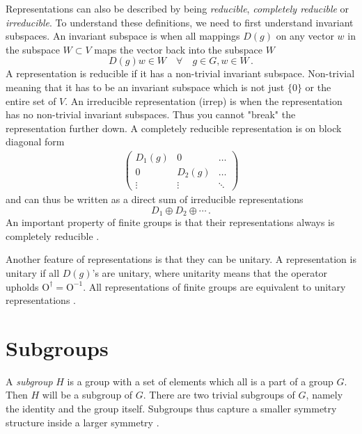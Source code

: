 Representations can also be described by being \textit{reducible},\textit{ completely reducible} or \textit{irreducible}. To understand these definitions, we need to first understand invariant subspaces. An invariant subspace is when all mappings $D(g)$ on any vector $w$ in the subspace $W\subset V $ maps the vector back into the subspace $W$ \cite{Georgi:1999wka}
\begin{equation}
    D(g)w\in W\quad \forall\quad g\in G, w\in W\,.
\end{equation}
A representation is reducible if it has a non-trivial invariant subspace. Non-trivial meaning that it has to be an invariant subspace which is not just $\{0\}$ or the entire set of $V$. An irreducible representation (irrep) is when the representation has no non-trivial invariant subspaces. Thus you cannot "break" the representation further down. A completely reducible representation is on block diagonal form 
\begin{align}
    \begin{pmatrix}
        D_1(g) & 0      & \dots  \\
        0      & D_2(g) & \dots  \\
        \vdots & \vdots & \ddots
    \end{pmatrix}
\end{align}
and can thus be written as a direct sum of irreducible representations
\begin{equation}
    D_1\oplus D_2 \oplus \cdots\,.
\end{equation}
An important property of finite groups is that their representations always is completely reducible \cite{Georgi:1999wka}.

Another feature of representations is that they can be unitary. A representation is unitary if all $D(g)$'s are unitary, where unitarity means that the operator upholds $\mathrm{O}^\dagger=\mathrm{O}^{-1}$. All representations of finite groups are equivalent to unitary representations \cite{Georgi:1999wka}.

\section{Subgroups}
A \textit{subgroup} $H$ is a group with a set of elements which all is a part of a group $G$. Then $H$ will be a subgroup of $G$. There are two trivial subgroups of $G$, namely the identity and the group itself. Subgroups thus capture a smaller symmetry structure inside a larger symmetry \cite{Georgi:1999wka}.

